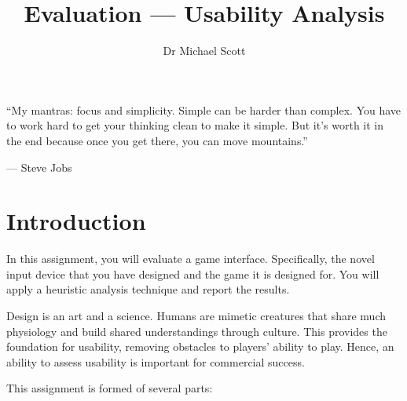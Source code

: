 \documentclass{../fal_assignment}
\title{Evaluation --- Usability Analysis}
\author{Dr Michael Scott}
\begin{document}
\maketitle
\begin{marginquote}
    ``My mantras: focus and simplicity. Simple can be harder than complex. You have to work hard to get your thinking clean to make it simple. But it's worth it in the end because once you get there, you can move mountains.''
    
    --- Steve Jobs
\end{marginquote}
\section*{Introduction}

In this assignment, you will evaluate a game interface. Specifically, the novel input device that you have designed and the game it is designed for. You will apply a heuristic analysis technique and report the results.

Design is an art and a science. Humans are mimetic creatures that share much physiology and build shared understandings through culture. This provides the foundation for usability, removing obstacles to players' ability to play. Hence, an ability to assess usability is important for commercial success.

This assignment is formed of several parts:
\end{document}

